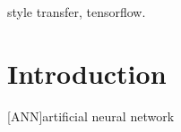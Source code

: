 \documentclass[journal, 12pt]{IEEEtran}
\def \myKeywords {style transfer, tensorflow} %
\begin{document}
\begin{abstract}
\end{abstract}

\begin{IEEEkeywords}
	\myKeywords.
\end{IEEEkeywords}

\section{Introduction} \label{sec:intro}






\begin{acronym}
	[ANN]{artificial neural network}
\end{acronym}


%


\end{document}
